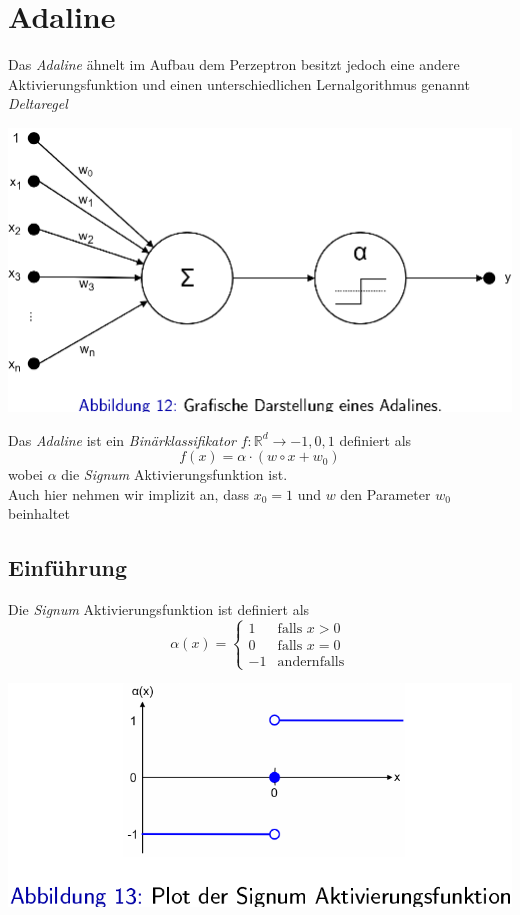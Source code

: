 \documentclass{report}
\begin{document}
\section{Adaline}
Das \textit{Adaline} ähnelt im Aufbau dem Perzeptron besitzt jedoch eine andere Aktivierungsfunktion und einen unterschiedlichen Lernalgorithmus genannt \textit{Deltaregel}
\begin{center}
  \includegraphics[scale=.2125]{ml04_11}
\end{center}
Das \textit{Adaline} ist ein \textit{Binärklassifikator} $f: \mathbb{R}^d \rightarrow {-1, 0, 1}$ definiert als
$$f(x) = \alpha\cdot(w\circ x + w_0)$$
wobei $\alpha$ die \textit{Signum} Aktivierungsfunktion ist.\\
Auch hier nehmen wir implizit an, dass $x_0 = 1$ und $w$ den Parameter $w_0$ beinhaltet

\subsection{Einführung}
Die \textit{Signum} Aktivierungsfunktion ist definiert als
\begin{equation*}
  \alpha(x) = \begin{cases}
    1 & \text{falls $x > 0$}\\
    0 & \text{falls $x = 0$}\\
    -1 & \text{andernfalls}
  \end{cases}
\end{equation*}

\begin{center}
  \includegraphics[scale=.2275]{ml04_12}
\end{center}
\end{document}
